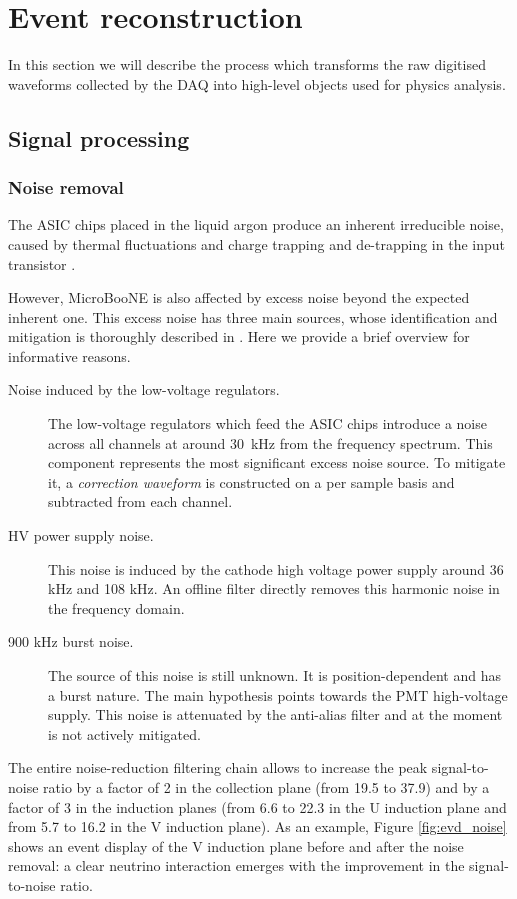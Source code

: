 \chapter{Event reconstruction}\label{sec:eventreco}

\minitoc

In this section we will describe the process which transforms the raw digitised waveforms collected by the DAQ into high-level objects used for physics analysis. 

\section{Signal processing}
\subsection{Noise removal}
The ASIC chips placed in the liquid argon produce an inherent irreducible noise, caused by thermal fluctuations and charge trapping and de-trapping in the input transistor \cite{Acciarri:2017sde}. 

However, MicroBooNE is also affected by excess noise beyond the expected inherent one. This excess noise has three main sources, whose identification and mitigation is thoroughly described in \cite{Acciarri:2017sde}. Here we provide a brief overview for informative reasons.
\begin{description}
\item[Noise induced by the low-voltage regulators.] The low-voltage regulators which feed the ASIC chips introduce a noise across all channels at around 30~kHz from the frequency spectrum. This component represents the most significant excess noise source. To mitigate it, a \emph{correction waveform} is constructed on a per sample basis and subtracted from each channel.
\item[HV power supply noise.] This noise is induced by the cathode high voltage power supply around 36 kHz and 108 kHz. An offline filter directly removes this harmonic noise in the frequency domain.
\item[900 kHz burst noise.] The source of this noise is still unknown. It is position-dependent and has a burst nature. The main hypothesis points towards the PMT high-voltage supply. This noise is attenuated by the anti-alias filter and at the moment is not actively mitigated.
\end{description}
The entire noise-reduction filtering chain allows to increase the peak signal-to-noise ratio by a factor of 2 in the collection plane (from 19.5 to 37.9) and by a factor of 3 in the induction planes (from 6.6 to 22.3 in the U induction plane and from 5.7 to 16.2 in the V induction plane). As an example, Figure \ref{fig:evd_noise} shows an event display of the V induction plane before and after the noise removal: a clear neutrino interaction emerges with the improvement in the signal-to-noise ratio. 

